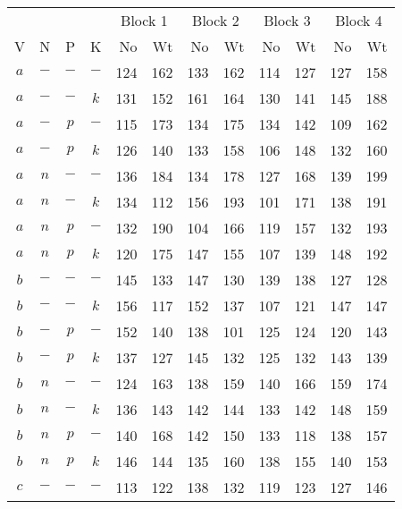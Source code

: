 \documentclass{article}
\newcommand{\strutt}{\vrule height 2.5ex depth 0.5ex width 0ex}%
\begin{document}
\begin{table}[ht]
\begin{center}
\begin{tabular}{@{\protect\strutt}|cccc|*{4}{rr|}}
\hline
&&&&\multicolumn{2}{c|}{Block 1}&\multicolumn{2}{c|}{Block
2}&\multicolumn{2}{c|}{Block 3}&\multicolumn{2}{c|}{Block 4}\\
  V  &   N  &   P  &   K  &   No &  Wt  &   No &  Wt  &    No &  Wt  &   No
  &  Wt\\
\hline
 $a$ &  $-$ &  $-$ &  $-$ &  124 & 162  &  133 & 162  &   114 & 127  &  127 & 158\\
 $a$ &  $-$ &  $-$ &  $k$ &  131 & 152  &  161 & 164  &   130 & 141  &  145 & 188\\
 $a$ &  $-$ &  $p$ &  $-$ &  115 & 173  &  134 & 175  &   134 & 142  &  109 & 162\\
 $a$ &  $-$ &  $p$ &  $k$ &  126 & 140  &  133 & 158  &   106 & 148  &  132 & 160\\
 $a$ &  $n$ &  $-$ &  $-$ &  136 & 184  &  134 & 178  &   127 & 168  &  139 & 199\\
 $a$ &  $n$ &  $-$ &  $k$ &  134 & 112  &  156 & 193  &   101 & 171  &  138 & 191\\
 $a$ &  $n$ &  $p$ &  $-$ &  132 & 190  &  104 & 166  &   119 & 157  &  132 & 193\\
 $a$ &  $n$ &  $p$ &  $k$ &  120 & 175  &  147 & 155  &   107 & 139  &  148 & 192\\
 $b$ &  $-$ &  $-$ &  $-$ &  145 & 133  &  147 & 130  &   139 & 138  &  127 & 128\\
 $b$ &  $-$ &  $-$ &  $k$ &  156 & 117  &  152 & 137  &   107 & 121  &  147 & 147\\
 $b$ &  $-$ &  $p$ &  $-$ &  152 & 140  &  138 & 101  &   125 & 124  &  120 & 143\\
 $b$ &  $-$ &  $p$ &  $k$ &  137 & 127  &  145 & 132  &   125 & 132  &  143 & 139\\
 $b$ &  $n$ &  $-$ &  $-$ &  124 & 163  &  138 & 159  &   140 & 166  &  159 & 174\\
 $b$ &  $n$ &  $-$ &  $k$ &  136 & 143  &  142 & 144  &   133 & 142  &  148 & 159\\
 $b$ &  $n$ &  $p$ &  $-$ &  140 & 168  &  142 & 150  &   133 & 118  &  138 & 157\\
 $b$ &  $n$ &  $p$ &  $k$ &  146 & 144  &  135 & 160  &   138 & 155  &  140 & 153\\
 $c$ &  $-$ &  $-$ &  $-$ &  113 & 122  &  138 & 132  &   119 & 123  &  127 & 146\\

\end{tabular}
\end{center}
\end{table}
\end{document}
